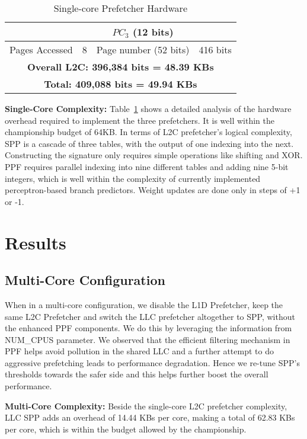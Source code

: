 \begin{table}[h]
\begin{adjustwidth}{}{}
\begin{adjustbox}{width=0.72\columnwidth}
\begin{tabular}{|c|c|c|c|}
                                                    &       & $PC_3$ (12 bits)      &           \\
    \hline
	Pages Accessed			&	8			   & 	Page number (52 bits) 	& 416 bits	\\
    \hline
        \multicolumn{4}{|c|}{\textbf{Overall L2C: 396,384 bits = 48.39 KBs}}\\
    \hline
        \multicolumn{4}{|c|}{\textbf{Total: 409,088 bits = 49.94 KBs}}\\
    \hline
    \end{tabular}
    \end{adjustbox}
    \caption{Single-core Prefetcher Hardware}
    \label{tab:PPF_overhead}
\end{adjustwidth}
\end{table}

\noindent \textbf{Single-Core Complexity:}
Table~\ref{tab:PPF_overhead}
shows a detailed analysis of the hardware overhead required to
implement the three prefetchers. It is well within the championship
budget of 64KB. In terms of L2C prefetcher's logical complexity, SPP
is a cascade of three tables, with the output of one indexing into the
next. Constructing the signature only requires simple operations like
shifting and XOR. PPF requires parallel indexing into nine different
tables and adding nine 5-bit integers, which is well within the
complexity of currently implemented perceptron-based branch
predictors.  Weight updates are done only in steps of +1 or -1.

\section{Results}
\label{Results}


\subsection{Multi-Core Configuration}
\label{Config-Multi}

When in a multi-core configuration, we disable the L1D Prefetcher, keep 
the same L2C Prefetcher and switch the LLC prefetcher altogether to SPP, 
without the enhanced PPF components.
We do this by leveraging the information from NUM\_CPUS parameter.
We observed that the efficient filtering mechanism in PPF helps avoid 
pollution in the shared LLC and a further attempt to do aggressive
prefetching leads to performance degradation.
Hence we re-tune SPP's thresholds towards the safer side and this
helps further boost the overall performance. 

\noindent \textbf{Multi-Core Complexity:}
Beside the single-core L2C prefetcher complexity, LLC SPP adds an overhead 
of 14.44 KBs per core, making a total of 62.83 KBs per core, which is within 
the budget allowed by the championship.
